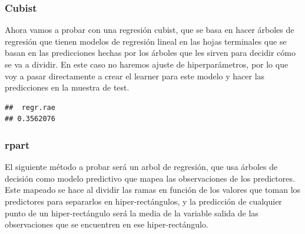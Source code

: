 \documentclass[
  11pt,
  a4paper,
]{article}
\newenvironment{Shaded}{\begin{snugshade}}{\end{snugshade}}
\newcommand{\AttributeTok}[1]{\textcolor[rgb]{0.77,0.63,0.00}{#1}}
\newcommand{\FunctionTok}[1]{\textcolor[rgb]{0.00,0.00,0.00}{#1}}
\newcommand{\NormalTok}[1]{#1}
\newcommand{\OtherTok}[1]{\textcolor[rgb]{0.56,0.35,0.01}{#1}}
\newcommand{\SpecialCharTok}[1]{\textcolor[rgb]{0.00,0.00,0.00}{#1}}
\newcommand{\StringTok}[1]{\textcolor[rgb]{0.31,0.60,0.02}{#1}}
\begin{document}
\subsubsection{Cubist}

Ahora vamos a probar con una regresión cubist, que se basa en hacer
árboles de regresión que tienen modelos de regresión lineal en las hojas
terminales que se basan en las predicciones hechas por los árboles que
les sirven para decidir cómo se va a dividir. En este caso no haremos
ajuste de hiperparámetros, por lo que voy a pasar directamente a crear
el learner para este modelo y hacer las predicciones en la muestra de
test.

\begin{Shaded}
\end{Shaded}

\begin{verbatim}
##  regr.rae 
## 0.3562076
\end{verbatim}

\subsubsection{rpart}

El siguiente método a probar será un arbol de regresión, que usa árboles
de decisión como modelo predictivo que mapea las observaciones de los
predictores. Este mapeado se hace al dividir las ramas en función de los
valores que toman los predictores para separarlos en hiper-rectángulos,
y la predicción de cualquier punto de un hiper-rectángulo será la media
de la variable salida de las observaciones que se encuentren en ese
hiper-rectángulo.

\begin{Shaded}
\end{Shaded}
\end{document}
